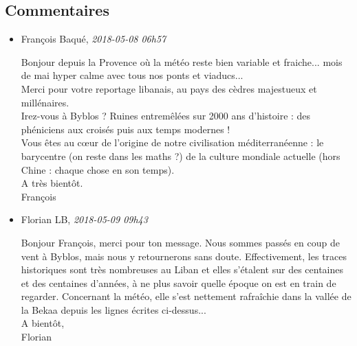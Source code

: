\documentclass[]{article}
\date{}
\begin{document}
\hypertarget{commentaires}{%
\subsection{Commentaires}\label{commentaires}}

\begin{itemize}
\item
  François Baqué, \emph{2018-05-08 06h57}

  Bonjour depuis la Provence où la météo reste bien variable et
  fraiche... mois de mai hyper calme avec tous nos ponts et viaducs...\\
  Merci pour votre reportage libanais, au pays des cèdres majestueux et
  millénaires.\\
  Irez-vous à Byblos ? Ruines entremêlées sur 2000 ans d'histoire : des
  phéniciens aux croisés puis aux temps modernes !\\
  Vous êtes au cœur de l'origine de notre civilisation méditerranéenne :
  le barycentre (on reste dans les maths ?) de la culture mondiale
  actuelle (hors Chine : chaque chose en son temps).\\
  A très bientôt.\\
  François
\item
  Florian LB, \emph{2018-05-09 09h43}

  Bonjour François, merci pour ton message. Nous sommes passés en coup
  de vent à Byblos, mais nous y retournerons sans doute. Effectivement,
  les traces historiques sont très nombreuses au Liban et elles
  s'étalent sur des centaines et des centaines d'années, à ne plus
  savoir quelle époque on est en train de regarder. Concernant la météo,
  elle s'est nettement rafraîchie dans la vallée de la Bekaa depuis les
  lignes écrites ci-dessus...\\
  A bientôt,\\
  Florian
\end{itemize}
\end{document}
